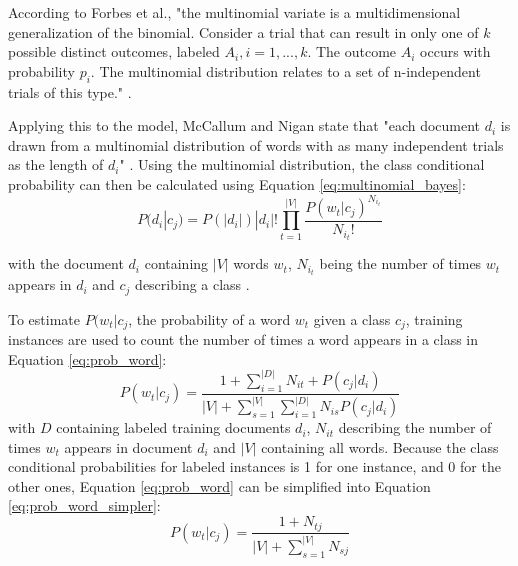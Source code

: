         
        According to Forbes et al., "the multinomial variate is a multidimensional generalization of the binomial. Consider a trial that can result in only one of $k$ possible distinct outcomes, labeled $A_i, i = 1,...,k$. The outcome $A_i$ occurs with probability $p_i$. The multinomial distribution relates to a set of n-independent trials of this type." \cite[p.~135]{evans2011statistical}.
        
        Applying this to the model, McCallum and Nigan state that "each document $d_i$ is drawn from a multinomial distribution of words with as many independent trials as the length of $d_i$" \cite[p.~3]{Mccallum1998}. Using the multinomial distribution, the class conditional probability can then be calculated using Equation \eqref{eq:multinomial_bayes}:
        \begin{equation}
            \label{eq:multinomial_bayes}
                P(d_i|c_j) = P(|d_i|)|d_i|!\prod_{t=1}^{|V|}\frac{P(w_t|c_j)^{N_{i_t}}}{N_{i_t}!}
        \end{equation}
        
        with the document $d_i$ containing $|V|$ words $w_t$, $N_{i_t}$ being the number of times $w_t$ appears in $d_i$ and $c_j$ describing a class \cite{Mccallum1998}. 
        
        To estimate $P(w_t|c_j$, the probability of a word $w_t$ given a class $c_j$, training instances are used to count the number of times a word appears in a class in Equation \eqref{eq:prob_word}:
        \begin{equation}
            \label{eq:prob_word}
                P(w_t|c_j) = \frac{1 + \sum_{i=1}^{|D|}N_{it} + P(c_j|d_i)}{|V| + \sum_{s=1}^{|V|} \sum_{i=1}^{|D|}N_{is} P (c_j|d_i)} 
        \end{equation}
        with $D$ containing labeled training documents $d_i$, $N_{it}$ describing the number of times $w_t$ appears in document $d_i$ and $|V|$ containing all words.
        Because the class conditional probabilities for labeled instances is 1 for one instance, and 0 for the other ones, Equation \eqref{eq:prob_word} can be simplified into Equation \eqref{eq:prob_word_simpler}:
                \begin{equation}
            \label{eq:prob_word_simpler}
                P(w_t|c_j) = \frac{1 + N_{tj}}{|V| + \sum_{s=1}^{|V|}N_{sj}} 
        \end{equation}
        
